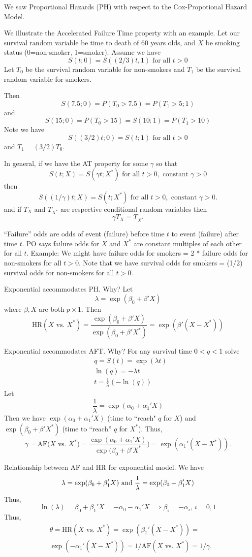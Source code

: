 \documentclass{article}
\begin{document}
 We saw Proportional Hazards (PH) with respect to the Cox-Propotional Hazard Model.

 We illustrate the Accelerated Failure Time property with an example. Let our survival random variable be time to death of 60 years olds, and $X$ be smoking status (0=non-smoker, 1=smoker).
Assume we have
\[
S(t;0) = S((2/3)t,1) \text{ for all } t>0
\]
Let $T_0$ be the survival random variable for non-smokers and $T_1$ be the survival random variable for smokers.

Then
\[ S(7.5;0) = P(T_0>7.5) = P(T_1>5;1) \]
 and
\[S(15;0) = P(T_0>15) = S(10;1) = P(T_1>10)
\]
Note we have
\[
S((3/2)t;0) = S(t;1) \text{ for all } t>0
\]
and $T_1=(3/2)T_0$.

 In general, if we have the AT property for some $\gamma$ so that
\[ S(t;X) =  S(\gamma t;X^*)  \text{ for all } t>0, \text{ constant } \gamma > 0
\]
then
 \[ S((1/\gamma)t;X) =  S( t;X^*)  \text{ for all } t>0, \text{ constant } \gamma > 0.
\]
and if $T_X$ and $T_{X^*}$ are respective conditional random variables then
\[
\gamma T_X = T_{X^*}
\]

 ``Failure'' odds are odds of event (failure) before time $t$ to event (failure) after time $t$. PO says failure odds for $X$ and $X^*$ are constant multiples of each other for all $t$. Example: We might have failure odds for smokers = 2 * failure odds for non-smokers for all $t>0$. Note that we have survival odds for smokers = (1/2) survival odds for non-smokers for all $t>0$.

 Exponential accommodates PH. Why? Let
\[
\lambda=\exp(\beta_0 + \beta' X)
\] where $\beta, X$ are both $p \times 1$.
Then
\[
\text{HR}(X \text{ vs. } X^*)  = \dfrac{\exp(\beta_0 + \beta' X)}{\exp(\beta_0 + \beta' X^*)} = \exp(\beta'(X - X^*))
\]

 Exponential accommodates AFT. Why? For any survival time $0 < q < 1$ solve
\begin{align*}
& q = S(t) = \exp(\lambda t) \\
& \ln(q) = - \lambda t \\
& t = \frac{1}{\lambda} (- \ln(q))
\end{align*}
Let
\[
\frac{1}{\lambda} = \exp(\alpha_0 + \alpha_1'X)
\]
Then we have $\exp(\alpha_0 + \alpha_1'X)$ (time to ``reach" $q$ for $X$) and \\ $\exp(\beta_0 + \beta'X^*)$ (time to ``reach'' $q$ for $X^*$). Thus,
\[
\gamma = \text{AF($X$ vs. $X^*$)} = \frac{\exp(\alpha_0 + \alpha_1'X)}{\exp(\beta_0 + \beta'X^*}) = \exp(\alpha_1'(X-X^*)).
\]

 Relationship between AF and HR for exponential model. We have
\[
\lambda = \exp(\beta_0 + \beta_1'X) \text{ and } \frac{1}{\lambda} = \exp(\beta_0 + \beta_1'X) \\
\]
Thus,
\[ \ln(\lambda) = \beta_0 + \beta_1'X = -\alpha_0 - \alpha_1'X \implies \beta_i = -\alpha_i, \, i=0,1 \]
Thus,
\begin{align*}
&\theta = \text{HR}(X \text{ vs. } X^*) = \exp(\beta_1'(X - X^*)) =\\
&\exp(-\alpha_1'(X - X^*)) = 1/\text{AF}(X \text{ vs. } X^*) = 1/\gamma.
\end{align*}
\end{document}
